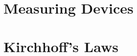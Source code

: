\section{Measuring Devices}

%    
%
%    
%
%    
%  
%
%
%
%
%  
%
%  
%
%
%
\section{Kirchhoff's Laws}
%
